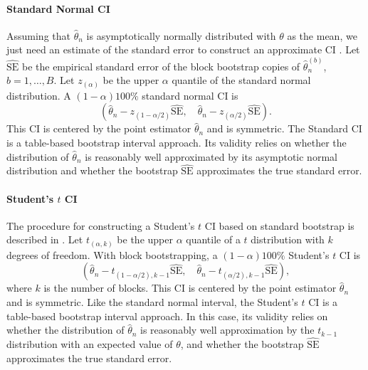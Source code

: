 \documentclass[12pt, letterpaper, titlepage]{article}
\newcommand{\eds}[1]{\textcolor{red}{EDS: (#1)}}
\newcommand{\mc}[1]{\textcolor{green}{MC: (#1)}}
\begin{document}
\paragraph{Standard Normal CI}
Assuming that $\hat\theta_n$ is asymptotically normally distributed with
$\theta$ as the mean, we just need an estimate of the standard error to
construct an approximate CI \citep[p.168]{efron1993introduction}. Let
$\widehat{\text{SE}}$ be the empirical standard error of the block bootstrap
copies of $\hat\theta_n^{(b)}$, $b = 1, \ldots, B$. Let $z_{(\alpha)}$ be the
upper $\alpha$ quantile of the standard normal distribution. A
$(1 - \alpha)100\%$ standard normal CI is
\[
(\hat{\theta}_{n} - z_{(1-\alpha/2)}\widehat{\text{SE}}, \quad
\hat{\theta}_{n} - z_{(\alpha/2)}\widehat{\text{SE}}).
\]
This CI is centered by the point estimator $\hat\theta_n$ and is symmetric. The
Standard CI is a table-based bootstrap interval approach. Its validity relies
on whether the distribution of $\hat\theta_n$ is reasonably well approximated
by its asymptotic normal distribution and whether the bootstrap
$\widehat{\text{SE}}$ approximates the true standard error.


\paragraph{Student's $t$ CI}
The procedure for constructing a Student's $t$ CI based on standard bootstrap
is described in \citet[p.158]{efron1993introduction}. Let $t_{(\alpha, k)}$ be
the upper $\alpha$ quantile of a $t$ distribution with $k$ degrees of freedom.
With block bootstrapping, a $(1 - \alpha)100\%$ Student's $t$ CI is
\[
(\hat{\theta}_{n} - t_{(1-\alpha/2), k - 1}\hat{\text{SE}}, \quad
\hat{\theta}_{n} - t_{(\alpha/2), k -1}\hat{\text{SE}}),
\]
where $k$ is the number of blocks. This CI is centered by the point estimator
$\hat\theta_n$ and is symmetric. Like the standard normal interval, the
Student's $t$ CI is a table-based bootstrap interval approach. In this case,
its validity relies on whether the distribution of $\hat\theta_n$ is
reasonably well approximation by the $t_{k-1}$ distribution with an expected
value of $\theta$, and whether the bootstrap $\widehat{\text{SE}}$
approximates the true standard error.
\end{document}
